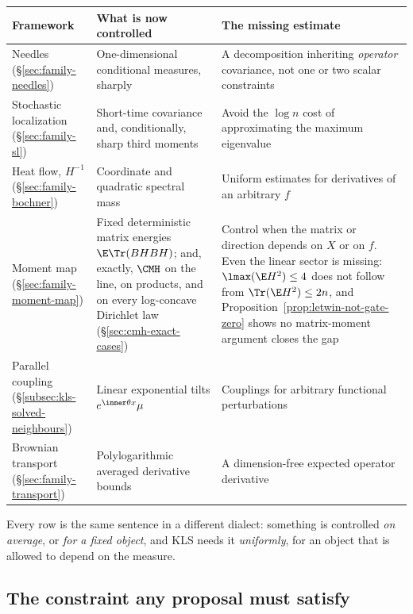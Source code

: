 \documentclass[../../main.tex]{subfiles}
\begin{document}
\begin{center}
\begin{tabularx}{\textwidth}{@{}>{\raggedright\arraybackslash}p{}>{\raggedright\arraybackslash}p{}Y@{}}
\toprule
Framework & What is now controlled & The missing estimate \\
\midrule
Needles (\S\ref{sec:family-needles}) & One-dimensional conditional measures, sharply &
A decomposition inheriting \emph{operator} covariance, not one or two scalar constraints \\
\addlinespace
Stochastic localization (\S\ref{sec:family-sl}) & Short-time covariance and, conditionally, sharp
third moments & Avoid the $\log n$ cost of approximating the maximum eigenvalue \\
\addlinespace
Heat flow, $H^{-1}$ (\S\ref{sec:family-bochner}) & Coordinate and quadratic spectral mass &
Uniform estimates for derivatives of an arbitrary $f$ \\
\addlinespace
Moment map (\S\ref{sec:family-moment-map}) & Fixed deterministic matrix energies
$\E\Tr(BHBH)$; and, exactly, $\CMH$ on the line, on products, and on every log-concave
Dirichlet law (\S\ref{sec:cmh-exact-cases}) & Control when the matrix or direction depends on
$X$ or on $f$. Even the linear sector is missing: $\lmax(\E H^2)\le4$ does not follow from
$\Tr(\E H^2)\le2n$, and Proposition~\ref{prop:letwin-not-gate-zero} shows no matrix-moment
argument closes the gap \\
\addlinespace
Parallel coupling (\S\ref{subsec:kls-solved-neighbours}) & Linear exponential tilts
$e^{\inner\theta x}\mu$ & Couplings for arbitrary functional perturbations \\
\addlinespace
Brownian transport (\S\ref{sec:family-transport}) & Polylogarithmic averaged derivative bounds &
A dimension-free expected operator derivative \\
\bottomrule
\end{tabularx}
\end{center}

Every row is the same sentence in a different dialect: something is controlled \emph{on average},
or \emph{for a fixed object}, and KLS needs it \emph{uniformly}, for an object that is allowed to
depend on the measure.

\subsection{The constraint any proposal must satisfy}
\label{subsec:synthesis-constraint}
\end{document}
